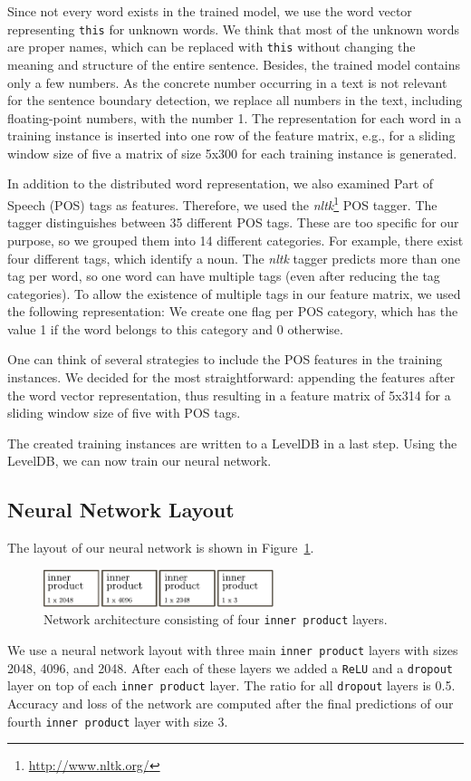 Since not every word exists in the trained model, we use the word vector representing \texttt{this} for unknown words.
We think that most of the unknown words are proper names, which can be replaced with \texttt{this} without changing the meaning and structure of the entire sentence.
Besides, the trained model contains only a few numbers.
As the concrete number occurring in a text is not relevant for the sentence boundary detection, we replace all numbers in the text, including floating-point numbers, with the number 1.
The representation for each word in a training instance is inserted into one row of the feature matrix, e.g., for a sliding window size of five a matrix of size 5x300 for each training instance is generated.

In addition to the distributed word representation, we also examined Part of Speech (POS) tags as features.
Therefore, we used the \emph{nltk}\footnote{\url{http://www.nltk.org/}} POS tagger.
The tagger distinguishes between 35 different POS tags.
These are too specific for our purpose, so we grouped them into 14 different categories.
For example, there exist four different tags, which identify a noun.
The \emph{nltk} tagger predicts more than one tag per word, so one word can have multiple tags (even after reducing the tag categories).
To allow the existence of multiple tags in our feature matrix, we used the following representation:
We create one flag per POS category, which has the value 1 if the word belongs to this category and 0 otherwise.

One can think of several strategies to include the POS features in the training instances.
We decided for the most straightforward: appending the features after the word vector representation, thus resulting in a feature matrix of 5x314 for a sliding window size of five with POS tags.

The created training instances are written to a LevelDB in a last step.
Using the LevelDB, we can now train our neural network.

\subsection{Neural Network Layout}

The layout of our neural network is shown in Figure~\ref{fig:net_lexical}.
\begin{figure}[ht]
    \centering
    \includegraphics[width=0.6\textwidth]{img/net_lexical.pdf}
    \caption{Network architecture consisting of four \texttt{inner product} layers.}
    \label{fig:net_lexical}
\end{figure}
We use a neural network layout with three main \texttt{inner product} layers with sizes 2048, 4096, and 2048.
After each of these layers we added a \texttt{ReLU} and a \texttt{dropout} layer on top of each \texttt{inner product} layer.
The ratio for all \texttt{dropout} layers is 0.5.
Accuracy and loss of the network are computed after the final predictions of our fourth \texttt{inner product} layer with size 3.

